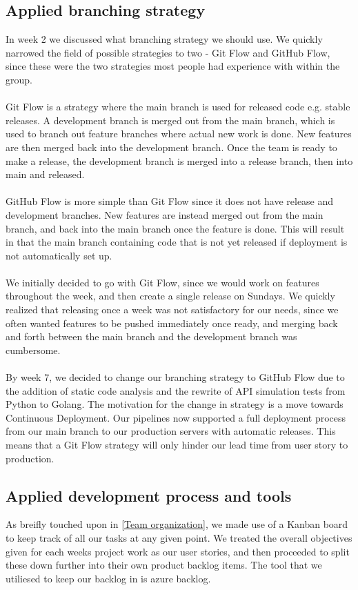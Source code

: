 \subsection{Applied branching strategy}
In week 2 we discussed what branching strategy we should use. We quickly narrowed the field of possible strategies to two - Git Flow and GitHub Flow, since these were the two strategies most people had experience with within the group. 
\\\\
Git Flow is a strategy where the main branch is used for released code e.g. stable releases. A development branch is merged out from the main branch, which is used to branch out feature branches where actual new work is done. New features are then merged back into the development branch. Once the team is ready to make a release, the development branch is merged into a release branch, then into main and released.
\\\\
GitHub Flow is more simple than Git Flow since it does not have release and development branches. New features are instead merged out from the main branch, and back into the main branch once the feature is done. This will result in that the main branch containing code that is not yet released if deployment is not automatically set up.
\\\\
We initially decided to go with Git Flow, since we would work on features throughout the week, and then create a single release on Sundays. We quickly realized that releasing once a week was not satisfactory for our needs, since we often wanted features to be pushed immediately once ready, and merging back and forth between the main branch and the development branch was cumbersome.
\\\\
By week 7, we decided to change our branching strategy to GitHub Flow due to the addition of static code analysis and the rewrite of API simulation tests from Python to Golang. The motivation for the change in strategy is a move towards Continuous Deployment. Our pipelines now supported a full deployment process from our main branch to our production servers with automatic releases. This means that a Git Flow strategy will only hinder our lead time from user story to production.

\subsection{Applied development process and tools}
As breifly touched upon in \ref{Team organization}, we made use of a Kanban board to keep track of all our tasks at any given point. We treated the overall objectives given for each weeks project work as our user stories, and then proceeded to split these down further into their own product backlog items. The tool that we utiliesed to keep our backlog in is azure backlog.
